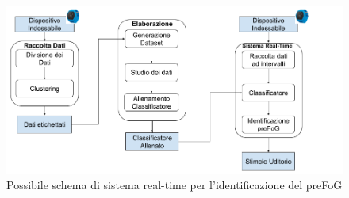 \begin{figure}[]
	\centering
	\includegraphics[scale=0.6,angle=90]{images/LavoroFuturo.png}
	\caption{Possibile schema di sistema real-time per l'identificazione del preFoG}
	\label{LavoroFuturo}
\end{figure}